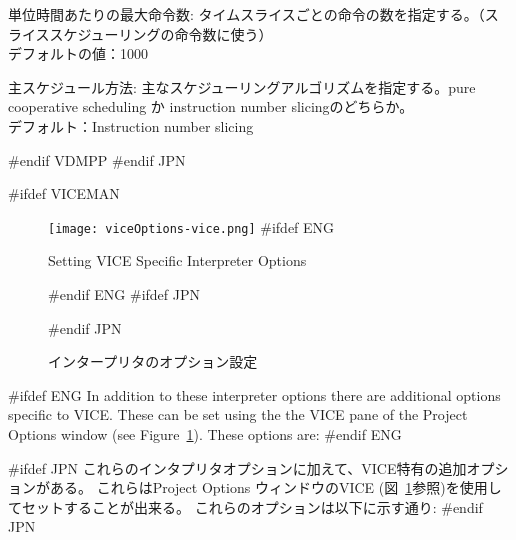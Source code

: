 \documentclass[\pformat,12pt]{article}
\newcommand{\guicmd}[1]{{\sf #1}}
\newcommand{\guicmd}[1]{{\gt #1}}
\begin{document}
\begin{list}{}{}
\item[\guicmd{単位時間あたりの最大命令数}:]
  タイムスライスごとの命令の数を指定する。（スライススケジューリングの命令数に使う） \\
  デフォルトの値：1000\\
  
\item[\guicmd{主スケジュール方法}:]
  主なスケジューリングアルゴリズムを指定する。pure cooperative scheduling か 
  instruction number slicingのどちらか。 \\
  デフォルト：Instruction number slicing

#endif VDMPP
#endif JPN
\end{list}

#ifdef VICEMAN
\begin{figure}[tbh]
\begin{center}
\texttt{[image: viceOptions-vice.png]}
#ifdef ENG
\caption{Setting VICE Specific Interpreter Options}
#endif ENG
#ifdef JPN
\caption{インタープリタのオプション設定}
#endif JPN
\label{fig:optintvice}
\end{center}
\end{figure}

#ifdef ENG
In addition to these interpreter options there are additional options
specific to VICE. These can be set using the the 
\guicmd{VICE} pane of the \guicmd{Project Options} window (see
Figure~\ref{fig:optintvice}). These options are:
#endif ENG

#ifdef JPN
これらのインタプリタオプションに加えて、VICE特有の追加オプションがある。
これらは\guicmd{Project Options} ウィンドウの\guicmd{VICE} 
(図~\ref{fig:optintvice}参照)を使用してセットすることが出来る。
これらのオプションは以下に示す通り:
#endif JPN
\end{document}
